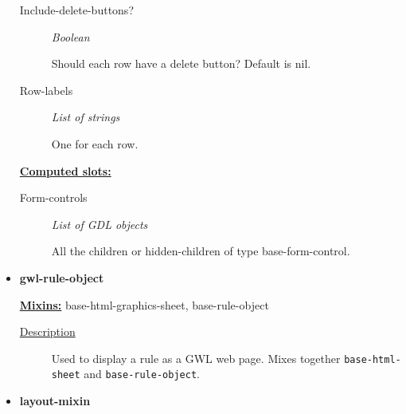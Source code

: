 \documentclass [11pt]{book}
\begin{document}
\begin{itemize}
\begin{description}
\item [Include-delete-buttons?]
\emph{Boolean}

 Should each row have a delete button?
Default is nil.




\item [Row-labels]
\emph{List of strings}

 One for each row.




\end{description}






\textbf{
\underline{Computed slots:}}

\begin{description}

\item [Form-controls]
\emph{List of GDL objects}

 All the children or hidden-children
of type base-form-control.




\end{description}







\item {}
\label{prim:gwl-rule-object}
\textbf{gwl-rule-object}


\textbf{
\underline{Mixins:}} base-html-graphics-sheet, base-rule-object





\begin{description}

\item [
\underline{Description}]


Used to display a rule as a GWL web page. 
Mixes together \texttt{base-html-sheet} and \texttt{base-rule-object}.



\end{description}









\item {}
\label{prim:layout-mixin}
\textbf{layout-mixin}



\end{itemize}
\end{document}
